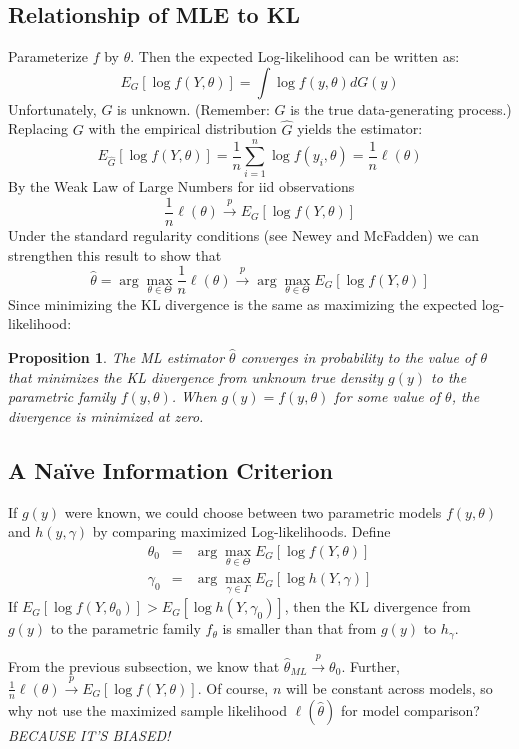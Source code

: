 \documentclass[12pt]{article}
\newtheorem{pro}{Proposition}[section]
\theoremstyle{definition}
\begin{document}
\subsection{Relationship of MLE to KL}
Parameterize $f$ by $\theta$. Then the expected Log-likelihood can be written as:
	$$E_G\left[\log{f(Y,\theta)}  \right] = \int \log{f(y,\theta)}dG(y)$$
Unfortunately, $G$ is unknown. (Remember: $G$ is the true data-generating process.) Replacing $G$ with the empirical distribution $\hat{G}$ yields the estimator:
	$$E_{\hat{G}}\left[\log{f(Y,\theta)}  \right] = \frac{1}{n}\sum_{i=1}^n \log{f(y_i, \theta)} = \frac{1}{n}\ell(\theta)$$
By the Weak Law of Large Numbers for iid observations
	$$\frac{1}{n} \ell(\theta) \overset{p}{\rightarrow} E_G\left[ \log{f(Y,\theta)} \right]$$
Under the standard regularity conditions (see Newey and McFadden) we can strengthen this result to show that
	$$\hat{\theta} = \arg \max_{\theta \in \Theta} \frac{1}{n}\ell(\theta) \overset{p}{\rightarrow} \arg \max_{\theta \in \Theta} E_G\left[ \log{f(Y,\theta)}\right]$$
Since minimizing the KL divergence is the same as maximizing the expected log-likelihood:
\begin{pro}
The ML estimator $\hat{\theta}$ converges in probability to the value of $\theta$ that minimizes the KL divergence from unknown true density $g(y)$ to the parametric family $f(y,\theta)$. When $g(y)=f(y,\theta)$ for some value of $\theta$, the divergence is minimized at zero.
\end{pro}


\subsection{A Na\"{i}ve Information Criterion} 
If $g(y)$ were known, we could choose between two parametric models $f(y,\theta)$ and $h(y,\gamma)$ by comparing maximized Log-likelihoods. Define
	\begin{eqnarray*}
	\theta_0 &=&  \arg \max_{\theta \in \Theta} E_G\left[ \log{f(Y,\theta)} \right]\\
	\gamma_0 &=&  \arg \max_{\gamma\in \Gamma} E_G\left[ \log{h(Y,\gamma)} \right]
	\end{eqnarray*}
If $E_G\left[ \log{f(Y,\theta_0)} \right] > E_G\left[ \log{h(Y,\gamma_0)} \right]$, then the KL divergence from $g(y)$ to the parametric family $f_\theta$ is smaller than that from $g(y)$ to $h_\gamma$.

From the previous subsection, we know that $\hat{\theta}_{ML} \overset{p}{\rightarrow} \theta_{0}$. Further, $\frac{1}{n}\ell(\theta) \overset{p}{\rightarrow} E_G\left[\log{f(Y,\theta)} \right]$. Of course, $n$ will be constant across models, so why not use the maximized sample likelihood $\ell(\hat{\theta})$ for model comparison? \emph{BECAUSE IT'S BIASED!}
\end{document}
